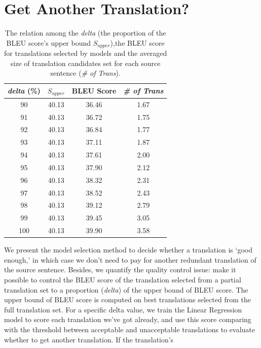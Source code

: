 \documentclass[11pt]{article}
\begin{document}
 \section{Get Another Translation?}
 
 
 \begin{table}[h]
\begin{tabular}{|c|c|c|c|}
\hline

\textit{delta} (\%) & $S_{upper}$ & BLEU Score & \textit{\# of Trans} \\ \hline
90         & 40.13       & 36.46      & 1.67       \\ \hline
91         & 40.13       & 36.72      & 1.75       \\ \hline
92         & 40.13       & 36.84      & 1.77       \\ \hline
93         & 40.13       & 37.11      & 1.87       \\ \hline
94         & 40.13       & 37.61      & 2.00       \\ \hline
95         & 40.13       & 37.90      & 2.12       \\ \hline
96         & 40.13       & 38.32      & 2.31       \\ \hline
97         & 40.13       & 38.52      & 2.43       \\ \hline
98         & 40.13       & 39.12      & 2.79       \\ \hline
99         & 40.13       & 39.45      & 3.05       \\ \hline
100        & 40.13       & 39.90      & 3.58       \\ \hline
\end{tabular}
\caption{The relation among the \textit{delta} (the proportion of the BLEU score's upper bound $S_{upper}$),the BLEU score for translations selected by models and the averaged size of translation candidates set for each source sentence (\textit{\# of Trans}).  }
    \label{orderanother}
\end{table}
We present the model selection method to decide whether a translation  is `good enough,' in which case we don't need to  pay for another redundant translation of the source sentence. Besides, we quantify the quality control  issue: make it possible to control the BLEU score of the translation selected from a partial translation set to a proportion (\textit{delta}) of the upper bound of BLEU score. The upper bound of BLEU score is computed on best translations selected from  the full translation set. For a specific delta value, we train the Linear Regression model to score each translation we've got already, and use this score comparing with the threshold between acceptable and unacceptable translations to evaluate whether to get another translation. If the translation's 
\end{document}
